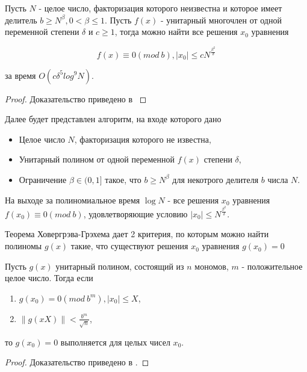   \begin{theorem}
   Пусть $N$ - целое число, факторизация которого неизвестна и которое имеет делитель {$b \ge N^\beta, 0 < \beta \le 1$}. Пусть {$f(x)$} - 
   унитарный многочлен от одной переменной степени {$\delta$} и {$c \ge 1$}, тогда можно найти все решения {$x_0$} уравнения
   
    \begin{equation}
      f(x) \equiv 0(mod \: b), |x_0| \le c N^{\frac{\beta^2}{\delta}}
    \end{equation}

    за время {$O(c \delta^5 log^9 N)$}.
    
    \begin{proof}
     Доказательство приведено в \cite[страницы 320-350]{may10}
    \end{proof}

  \end{theorem}
  
  Далее будет представлен алгоритм, на входе которого дано
    \begin{itemize}
     \item Целое число {$N$}, факторизация которого не известна,
     \item Унитарный полином от одной переменной {$f(x)$} степени {$\delta$},
     \item Ограничение {$\beta \in (0,1]$} такое, что {$b \ge N^\beta$} для некотрого делителя {$b$} числа {$N$}.
    \end{itemize}

    На выходе за полиномиальное время $\log{N}$ - все решения $x_0$ уравнения {$f(x_0) \equiv 0 (mod \: b)$}, удовлетворяющие условию
    {$|x_0| \le N^{\frac{\beta^2}{\delta}}$}.  
    
  Теорема Ховергрэва-Грэхема дает 2 критерия, по которым можно найти полиномы {$g(x)$} такие, что существуют решения $x_0$ уравнения $g(x_0)=0$

  \begin{theorem}
   Пусть {$g(x)$} унитарный полином, состоящий из {$n$} мономов, {$m$} - положительное целое число. Тогда если
   
    \begin{enumerate}
     \item {$g(x_0) = 0(mod \: b^m), |x_0| \le X$},
     \item {$ \lVert g(x X) \lVert < \frac{b^m}{\sqrt{n}} $},
    \end{enumerate}
    
    то {$g(x_0) = 0$} выполняется для целых чисел $x_0$.
    
    \begin{proof}
      Доказательство приведено в \cite[страницы 321-322]{may10}.
    \end{proof}

  \end{theorem}

